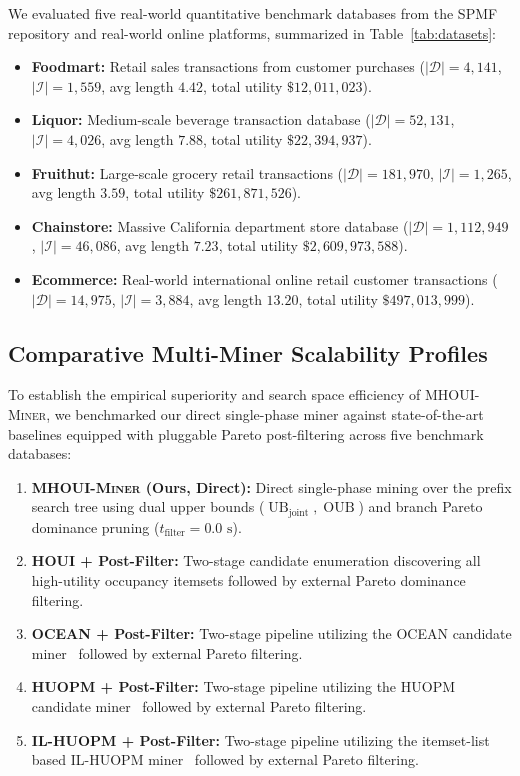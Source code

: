 \documentclass[runningheads]{llncs}
\newcommand{\MHOUIminer}{\textsc{MHOUI-Miner}}
\newcommand{\OUB}{\operatorname{OUB}}
\newcommand{\UBjoint}{\operatorname{UB}_{\mathrm{joint}}}
\begin{document}
We evaluated five real-world quantitative benchmark databases from the SPMF repository and real-world online platforms, summarized in Table~\ref{tab:datasets}:
\begin{itemize}
    \item \textbf{Foodmart:} Retail sales transactions from customer purchases ($|\mathcal{D}| = 4{,}141$, $|\mathcal{I}| = 1{,}559$, avg length $4.42$, total utility $\$12{,}011{,}023$).
    \item \textbf{Liquor:} Medium-scale beverage transaction database ($|\mathcal{D}| = 52{,}131$, $|\mathcal{I}| = 4{,}026$, avg length $7.88$, total utility $\$22{,}394{,}937$).
    \item \textbf{Fruithut:} Large-scale grocery retail transactions ($|\mathcal{D}| = 181{,}970$, $|\mathcal{I}| = 1{,}265$, avg length $3.59$, total utility $\$261{,}871{,}526$).
    \item \textbf{Chainstore:} Massive California department store database ($|\mathcal{D}| = 1{,}112{,}949$, $|\mathcal{I}| = 46{,}086$, avg length $7.23$, total utility $\$2{,}609{,}973{,}588$).
    \item \textbf{Ecommerce:} Real-world international online retail customer transactions ($|\mathcal{D}| = 14{,}975$, $|\mathcal{I}| = 3{,}884$, avg length $13.20$, total utility $\$497{,}013{,}999$).
\end{itemize}

\subsection{Comparative Multi-Miner Scalability Profiles}
\label{sec:multiminer_scalability}

To establish the empirical superiority and search space efficiency of \MHOUIminer{}, we benchmarked our direct single-phase miner against state-of-the-art baselines equipped with pluggable Pareto post-filtering across five benchmark databases:
\begin{enumerate}
    \item \textbf{\MHOUIminer{} (Ours, Direct):} Direct single-phase mining over the prefix search tree using dual upper bounds ($\UBjoint, \OUB$) and branch Pareto dominance pruning ($t_{\text{filter}} = 0.0\text{ s}$).
    \item \textbf{\textsc{HOUI} + Post-Filter:} Two-stage candidate enumeration discovering all high-utility occupancy itemsets followed by external Pareto dominance filtering.
    \item \textbf{\textsc{OCEAN} + Post-Filter:} Two-stage pipeline utilizing the OCEAN candidate miner~\cite{shen2016ocean} followed by external Pareto filtering.
    \item \textbf{\textsc{HUOPM} + Post-Filter:} Two-stage pipeline utilizing the HUOPM candidate miner~\cite{gan2020huopm} followed by external Pareto filtering.
    \item \textbf{\textsc{IL-HUOPM} + Post-Filter:} Two-stage pipeline utilizing the itemset-list based IL-HUOPM miner~\cite{lin2021efficient} followed by external Pareto filtering.
\end{enumerate}
\end{document}
